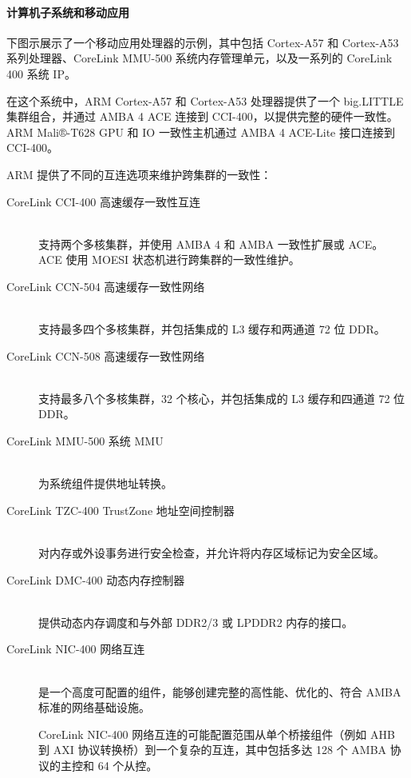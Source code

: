 \paragraph{计算机子系统和移动应用}

下图示展示了一个移动应用处理器的示例，其中包括 Cortex-A57 和 Cortex-A53 系列处理器、CoreLink MMU-500 系统内存管理单元，以及一系列的 CoreLink 400 系统 IP。


在这个系统中，ARM
Cortex-A57 和 Cortex-A53 处理器提供了一个 big.LITTLE 集群组合，并通过 AMBA 4
ACE 连接到 CCI-400，以提供完整的硬件一致性。
ARM Mali®-T628
GPU 和 IO 一致性主机通过 AMBA 4 ACE-Lite 接口连接到 CCI-400。

ARM 提供了不同的互连选项来维护跨集群的一致性：

\begin{description}
  \item [CoreLink CCI-400 高速缓存一致性互连] \hfill \\
    支持两个多核集群，并使用 AMBA
    4 和 AMBA 一致性扩展或 ACE。
    ACE 使用 MOESI 状态机进行跨集群的一致性维护。
  \item [CoreLink CCN-504 高速缓存一致性网络] \hfill \\
    支持最多四个多核集群，并包括集成的 L3 缓存和两通道 72 位 DDR。
  \item [CoreLink CCN-508 高速缓存一致性网络] \hfill \\
    支持最多八个多核集群，32 个核心，并包括集成的 L3 缓存和四通道 72 位 DDR。
  \item [CoreLink MMU-500 系统 MMU] \hfill \\
    为系统组件提供地址转换。
  \item [CoreLink TZC-400 TrustZone 地址空间控制器] \hfill \\
    对内存或外设事务进行安全检查，并允许将内存区域标记为安全区域。
  \item [CoreLink DMC-400 动态内存控制器] \hfill \\
    提供动态内存调度和与外部 DDR2/3 或 LPDDR2 内存的接口。
  \item [CoreLink NIC-400 网络互连] \hfill \\
    是一个高度可配置的组件，能够创建完整的高性能、优化的、符合 AMBA 标准的网络基础设施。

    CoreLink NIC-400 网络互连的可能配置范围从单个桥接组件（例如 AHB 到 AXI 协议转换桥）到一个复杂的互连，其中包括多达 128 个 AMBA 协议的主控和 64 个从控。
\end{description}
